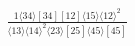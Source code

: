 \documentclass[varwidth, border=5pt]{standalone}
\begin{document}
\begin{my}
$\begin{gathered}
\scriptscriptstyle\frac{1⟨34⟩[34][12]⟨15⟩⟨12⟩^2}{⟨13⟩⟨14⟩^2⟨23⟩[25]⟨45⟩[45]}
\end{gathered}$
\end{my}
\end{document}
